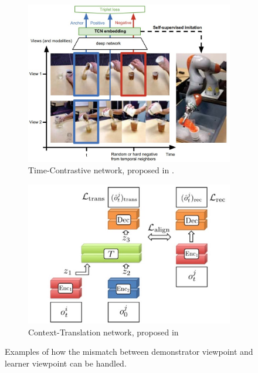 \begin{figure}[htb!]
    \centering
    \begin{subfigure}[b]{0.50\textwidth}
        \centering
        \includegraphics[width=\textwidth]{Figures/images/view_point_mismatch/time-contrastive-network.jpg}
        \caption{Time-Contrastive network, proposed in \cite{sermanet2018time_contrastive}.}
        \label{fig:time_contrastive}
    \end{subfigure}
    \hfill
    \begin{subfigure}[b]{0.45\textwidth}
        \includegraphics[width=\textwidth]{Figures/images/view_point_mismatch/context-translation-model.jpg}
        \caption{Context-Translation network, proposed in \cite{liu2018imitation_from_observation}}
        \label{fig:context-translation}
    \end{subfigure}
    \caption{Examples of how the mismatch between demonstrator viewpoint and learner viewpoint can be handled.}
    \label{fig:differet_viewpoint}
\end{figure}
